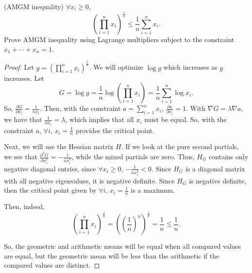 \documentclass[../hw5]{subfiles}
\begin{document}
\begin{problem}[5]
(AMGM inequality) $\forall x_i\ge 0$, \[
	{\left( \prod\limits_{i=1}^{n}x_i\right) }^{\frac{1}{n}}\le \frac{1}{n} \sum\limits_{i=1}^{n}x_i
	.\]
Prove AMGM inequality using Lagrange multipliers subject to the constraint $x_1 + \cdots + x_n=1$.
\end{problem}
\begin{proof}
	Let $g = {\left( \prod\limits_{i=1}^{n}x_i\right) }^{\frac{1}{n}}$.
	We will optimize $\log{g}$ which increases as  $g$ increases.
	Let \[
		G=\log{g}=\frac{1}{n}\log{\left( \prod\limits_{i=1}^{n}x_i \right) } = \frac{1}{n}\sum\limits_{i=1}^{n}\log{x_i}
		.\]
	So, $\frac{\partial G}{\partial x_i}=\frac{1}{nx_i}$.
	Then, with the constraint $a=\sum\limits_{i=1}^{n}x_i$, $\frac{\partial a}{\partial x_i}=1$.
	With $\nabla G = \lambda \nabla a$, we have that $\frac{1}{nx_i} = \lambda$, which implies that all $x_i$ must be equal.
	So, with the constraint $a$, $\forall i,\, x_i=\frac{1}{n}$ provides the critical point.

	Next, we will use the Hessian matrix $H$.
	If we look at the pure second partials, we see that $\frac{\partial^{2} G}{\partial x_i^2}=-\frac{1}{nx_i^2}$, while the mixed partials are zero.
	Thus, $H_G$ contains only negative diagonal entries, since  $\forall x_i \ge 0$, $-\frac{1}{nx_i^2}<0$.
	Since $H_G$ is a diagonal matrix with all negative eigenvalues, it is negative definite.
	Since $H_G$ is negative definite, then the critical point given by  $\forall i,\, x_i=\frac{1}{n}$ is a maximum.

	Then, indeed, \[
		{\left( \prod\limits_{i=1}^{n}x_i\right) }^{\frac{1}{n}} = {\left({{\left( \frac{1}{n} \right) }^n}\right)}^{\frac{1}{n}} = \frac{1}{n} \le \frac{1}{n}
		.\]

	So, the geometric and arithmetic means will be equal when all compared values are equal, but the geometric mean will be less than the arithmetic if the compared values are distinct.
\end{proof}
\end{document}
